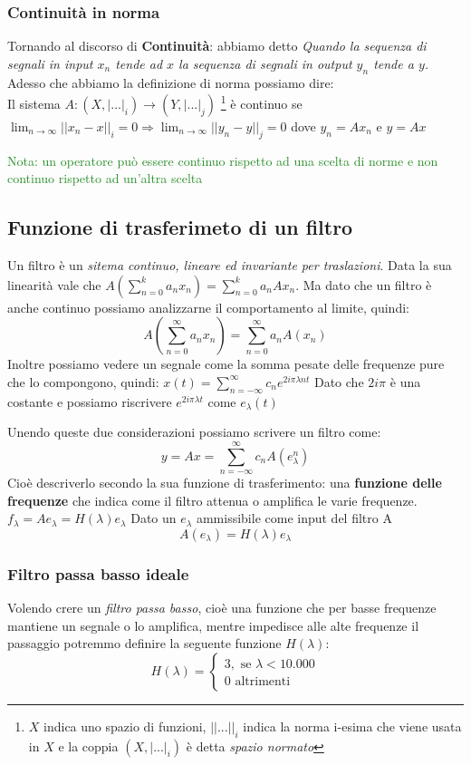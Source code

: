 \documentclass[a4paper]{article}
\newcommand{\appunto}[1]{\textcolor{ForestGreen}{#1}}
\begin{document}
\subsubsection{Continuità in norma}
\label{sec:continuità}
Tornando al discorso di \textbf{Continuità}: abbiamo detto \textit{ Quando la sequenza di segnali in input $x_n$ tende ad $x$ la sequenza di segnali in output $y_n$ tende a $y$.}
Adesso che abbiamo la definizione di norma possiamo dire:\\
Il sistema $A : (X, |. . . |_i ) \rightarrow (Y, | . . . |_j )$ \footnote{$X$ indica uno spazio di funzioni, $||...||_i$ indica la norma i-esima che viene usata in $X$ e la coppia $(X,|...|_i)$ è detta \textit{spazio normato}}
è continuo se\\ $\lim_{n\to\infty} ||x_n -x ||_i = 0 \Rightarrow \lim_{n\to\infty} ||y_n - y||_j = 0$ dove $y_n = Ax_n$  e $y = Ax$

\appunto{Nota: un operatore può essere continuo rispetto ad una scelta di norme e non continuo rispetto ad un'altra scelta}
\subsection{Funzione di trasferimeto di un filtro}
Un filtro è un \textit{sitema continuo, lineare ed invariante per traslazioni}.
Data la sua linearità vale che $A(\sum^k_{n=0} a_nx_n)= \sum^k_{n=0} a_nAx_n $.
Ma dato che un filtro è anche continuo possiamo analizzarne il comportamento al limite, quindi:
$$A(\sum^{\infty}_{n=0} a_nx_n)= \sum^{\infty}_{n=0} a_nA(x_n)$$
Inoltre possiamo vedere un segnale come la somma pesate delle frequenze pure che lo compongono, quindi:
$x(t)= \sum^{\infty}_{n=-\infty} c_ne^{2i\pi \lambda nt}$
Dato che $2i\pi$ è una costante e possiamo riscrivere $e^{2i\pi \lambda t}$ come $e_{\lambda}(t)$

Unendo queste due considerazioni possiamo scrivere un filtro come:
$$y=Ax= \sum^{\infty}_{n=-\infty} c_nA(e^n_{\lambda})$$
Cioè descriverlo secondo la sua funzione di trasferimento: una \textbf{funzione delle frequenze} che indica come il filtro attenua o amplifica le varie frequenze.
$f_{\lambda} = Ae_{\lambda} = H(\lambda)e_{\lambda}$
Dato un $e_{\lambda}$ ammissibile come input del filtro A
$$A(e_{\lambda}) = H(\lambda) e_{\lambda}$$

\subsubsection{Filtro passa basso ideale}
Volendo crere un \textit{filtro passa basso}, cioè una funzione che per basse frequenze mantiene un segnale o lo amplifica, mentre impedisce alle alte frequenze il passaggio potremmo definire la seguente funzione $H(\lambda)$:
\begin{equation*}
H(\lambda)=
	\begin{cases}
		3, \text{ se } \lambda < 10.000 \\
		0 \text{  altrimenti}
	\end{cases}
\end{equation*}
\end{document}
